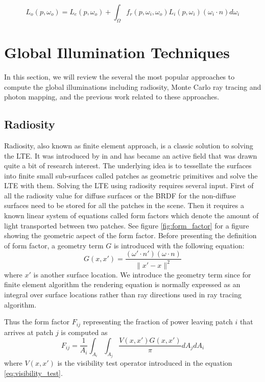 \begin{equation}
L_{o}(p, \omega_{o}) = L_{e}(p, \omega_{o}) + \int_{\Omega}f_{r}(p, \omega_{i}, \omega_{o})L_{i}(p, \omega_{i})(\omega_{i} \cdot n)d\omega_{i}
\label{eq:lte}
\end{equation}


\section{Global Illumination Techniques}
In this section, we will review the several the most popular approaches to compute the global illuminations including radiosity, Monte Carlo ray tracing and photon mapping, and the previous work related to these approaches.

\subsection{Radiosity}

Radiosity, also known as finite element approach, is a classic solution to solving the LTE. It was introduced by \citeauthor{Goral:1984:MIL:964965.808601} in \citep{Goral:1984:MIL:964965.808601} and has became an active field that was drawn quite a bit of research interest. The underlying idea is to tessellate the surfaces into finite small sub-surfaces called patches as geometric primitives and solve the LTE with them. Solving the LTE using radiosity requires several input. First of all the radiosity value for diffuse surfaces or the BRDF for the non-diffuse surfaces need to be stored for all the patches in the scene. Then it requires a known linear system of equations called form factors which denote the amount of light transported between two patches. See figure \ref{fig:form_factor} for a figure showing the geometric aspect of the form factor. Before presenting the definition of form factor, a geometry term \(G\) is introduced with the following equation:
\begin{equation}
G(x, x') = \frac{(\omega' \cdot n')(\omega \cdot n)}{\|x' - x\|^2}
\label{eq:geometry_term}
\end{equation}
where \(x'\) is another surface location. We introduce the geometry term since for finite element algorithm the rendering equation is normally expressed as an integral over surface locations rather than ray directions used in ray tracing algorithm.

Thus the form factor \(F_{ij}\) representing the fraction of power leaving patch \(i\) that arrives at patch \(j\) is computed as
\begin{equation}
F_{ij} = \frac{1}{A_i} \int_{A_i} \int_{A_j} \frac{V(x, x')G(x, x')}{\pi} dA_j dA_i
\label{eq:form_factor}
\end{equation}
where \(V(x, x')\) is the visibility test operator introduced in the equation \ref{eq:visibility_test}.

